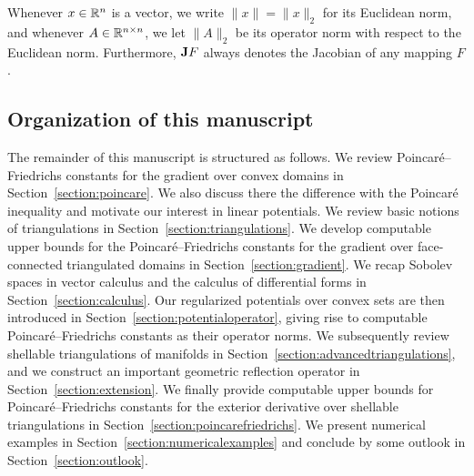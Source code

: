 \documentclass[10pt,a4paper]{article}
\begin{document}
Whenever $x \in {\mathbb R}^{n}$ is a vector, we write $\|x\| = \|x\|_{2}$ for its Euclidean norm, 
and whenever $A \in {\mathbb R}^{n \times n}$, we let $\| A \|_{2}$ be its operator norm with respect to the Euclidean norm. 
Furthermore, ${\mathbf{J}} F$ always denotes the Jacobian of any mapping $F$. 




\subsection{Organization of this manuscript}

The remainder of this manuscript is structured as follows.
We review Poincar\'e--Friedrichs constants for the gradient over convex domains in Section~\ref{section:poincare}. 
We also discuss there the difference with the Poincar\'e inequality and motivate our interest in linear potentials.
We review basic notions of triangulations in Section~\ref{section:triangulations}.
We develop computable upper bounds for the Poincar\'e--Friedrichs constants for the gradient over face-connected triangulated domains in Section~\ref{section:gradient}.
We recap Sobolev spaces in vector calculus and the calculus of differential forms in Section~\ref{section:calculus}. 
Our regularized potentials over convex sets are then introduced in Section~\ref{section:potentialoperator}, 
giving rise to computable Poincar\'e--Friedrichs constants as their operator norms. 
We subsequently review shellable triangulations of manifolds in Section~\ref{section:advancedtriangulations},
and we construct an important geometric reflection operator in Section~\ref{section:extension}. 
We finally provide computable upper bounds for Poincar\'e--Friedrichs constants for the exterior derivative over shellable triangulations in Section~\ref{section:poincarefriedrichs}.
We present numerical examples in Section~\ref{section:numericalexamples} and conclude by some outlook in Section~\ref{section:outlook}. 
\end{document}
